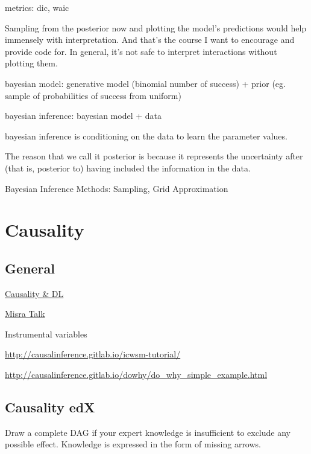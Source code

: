 \documentclass[]{book}
\begin{document}
metrics: dic, waic

Sampling from the posterior now and plotting the model's predictions
would help immensely with interpretation. And that's the course I want
to encourage and provide code for. In general, it's not safe to
interpret interactions without plotting them.

bayesian model: generative model (binomial number of success) + prior
(eg. sample of probabilities of success from uniform)

bayesian inference: bayesian model + data

bayesian inference is conditioning on the data to learn the parameter
values.

The reason that we call it posterior is because it represents the
uncertainty after (that is, posterior to) having included the
information in the data.

Bayesian Inference Methods: Sampling, Grid Approximation

\chapter{Causality}\label{causality}

\section{General}\label{general-10}

\href{https://twitter.com/tdietterich/status/1034631407904018437}{Causality
\& DL}

\href{https://pages.dataiku.com/hubfs/PDF/Meetup-Presentation/06-18_Stress-Testing_Mishra.pdf?t=1532033314245\&utm_campaign=US\%20Event\%20Meetup\%20NYU\%20NYC\%20July\%202018\&utm_source=hs_email\&utm_medium=email\&utm_content=64589348\&_hsenc=p2ANqtz-9_41UxxLKzauP5Gf5bbRh63DzcsGFL8hMuW8HH8a_a1AeS9zaESqO-PoTbCkzXirAvWBJnHgvb-PEi_l7ds9IWg_y25H7xE2uVhBib3XwWmO68PBI\&_hsmi=64589348}{Misra
Talk}

Instrumental variables

\url{http://causalinference.gitlab.io/icwsm-tutorial/}

\url{http://causalinference.gitlab.io/dowhy/do_why_simple_example.html}

\section{Causality edX}\label{causality-edx}

Draw a complete DAG if your expert knowledge is insufficient to exclude
any possible effect. Knowledge is expressed in the form of missing
arrows.
\end{document}
